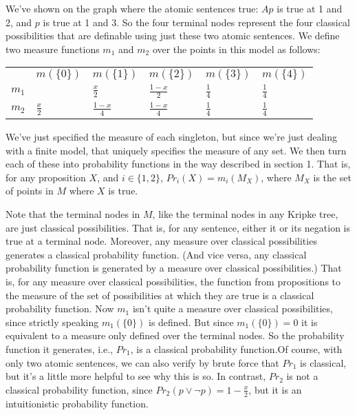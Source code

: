 \documentclass[
  11pt,
  letterpaper,
  DIV=11,
  numbers=noendperiod,
  oneside]{scrartcl}
\begin{document}
We've shown on the graph where the atomic sentences true: \(Ap\) is true
at 1 and 2, and \(p\) is true at 1 and 3. So the four terminal nodes
represent the four classical possibilities that are definable using just
these two atomic sentences. We define two measure functions \(m_1\) and
\(m_2\) over the points in this model as follows:

\begin{longtable}[]{@{}
  >{\raggedright\arraybackslash}p{}
  >{\centering\arraybackslash}p{}
  >{\centering\arraybackslash}p{}
  >{\centering\arraybackslash}p{}
  >{\centering\arraybackslash}p{}
  >{\centering\arraybackslash}p{}@{}}
\toprule\noalign{}
\endhead
\bottomrule\noalign{}
\endlastfoot
& \(m(\{0\})\) & \(m(\{1\})\) & \(m(\{2\})\) & \(m(\{3\})\) &
\(m(\{4\})\) \\
\(m_1\) & 0 & \(\frac{x}{2}\) & \(\frac{1-x}{2}\) & \(\frac{1}{4}\) &
\(\frac{1}{4}\) \\
\(m_2\) & \(\frac{x}{2}\) & \(\frac{1-x}{4}\) & \(\frac{1-x}{4}\) &
\(\frac{1}{4}\) & \(\frac{1}{4}\) \\
\end{longtable}

We've just specified the measure of each singleton, but since we're just
dealing with a finite model, that uniquely specifies the measure of any
set. We then turn each of these into probability functions in the way
described in section 1. That is, for any proposition \(X\), and
\(i \in \{1, 2\}\), \(Pr_i(X) = m_i(M_X)\), where \(M_X\) is the set of
points in \(M\) where \(X\) is true.

Note that the terminal nodes in \(M\), like the terminal nodes in any
Kripke tree, are just classical possibilities. That is, for any
sentence, either it or its negation is true at a terminal node.
Moreover, any measure over classical possibilities generates a classical
probability function. (And vice versa, any classical probability
function is generated by a measure over classical possibilities.) That
is, for any measure over classical possibilities, the function from
propositions to the measure of the set of possibilities at which they
are true is a classical probability function. Now \(m_1\) isn't quite a
measure over classical possibilities, since strictly speaking
\(m_1(\{0\})\) is defined. But since \(m_1(\{0\}) = 0\) it is equivalent
to a measure only defined over the terminal nodes. So the probability
function it generates, i.e., \(Pr_1\), is a classical probability
function.Of course, with only two atomic sentences, we can also verify
by brute force that \(Pr_1\) is classical, but it's a little more
helpful to see why this is so. In contrast, \(Pr_2\) is not a classical
probability function, since \(Pr_2(p \vee \neg p) = 1 - \frac{x}{2}\),
but it is an intuitionistic probability function.
\end{document}
